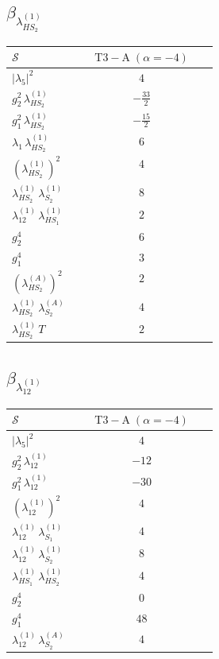 \documentclass[9pt]{article}
\begin{document}
\subsection*{$ \beta_{\lambda_{HS_2}^{(1)}} $}
\begin{longtable}{@{}p{0.31\linewidth}c@{}}
\toprule
$\mathcal{S}$ & $ \mathrm{T3-A}\;(\alpha=-4) $ \\
\midrule
$ |\lambda_5|^2 $ & $ 4 $ \\
$ g_2^2\,\lambda_{HS_2}^{(1)} $ & $ - \frac{33}{2} $ \\
$ g_1^2\,\lambda_{HS_2}^{(1)} $ & $ - \frac{15}{2} $ \\
$ \lambda_1\,\lambda_{HS_2}^{(1)} $ & $ 6 $ \\
$ \left(\lambda_{HS_2}^{(1)}\right)^2 $ & $ 4 $ \\
$ \lambda_{HS_2}^{(1)}\,\lambda_{S_2}^{(1)} $ & $ 8 $ \\
$ \lambda_{12}^{(1)}\,\lambda_{HS_1}^{(1)} $ & $ 2 $ \\
$ g_2^4 $ & $ 6 $ \\
$ g_1^4 $ & $ 3 $ \\
$ \left(\lambda_{HS_2}^{(A)}\right)^2 $ & $ 2 $ \\
$ \lambda_{HS_2}^{(1)}\,\lambda_{S_2}^{(A)} $ & $ 4 $ \\
$ \lambda_{HS_2}^{(1)}\,T $ & $ 2 $ \\
\bottomrule
\end{longtable}
\subsection*{$ \beta_{\lambda_{12}^{(1)}} $}
\begin{longtable}{@{}p{0.31\linewidth}c@{}}
\toprule
$\mathcal{S}$ & $ \mathrm{T3-A}\;(\alpha=-4) $ \\
\midrule
$ |\lambda_5|^2 $ & $ 4 $ \\
$ g_2^2\,\lambda_{12}^{(1)} $ & $ -12 $ \\
$ g_1^2\,\lambda_{12}^{(1)} $ & $ -30 $ \\
$ \left(\lambda_{12}^{(1)}\right)^2 $ & $ 4 $ \\
$ \lambda_{12}^{(1)}\,\lambda_{S_1}^{(1)} $ & $ 4 $ \\
$ \lambda_{12}^{(1)}\,\lambda_{S_2}^{(1)} $ & $ 8 $ \\
$ \lambda_{HS_1}^{(1)}\,\lambda_{HS_2}^{(1)} $ & $ 4 $ \\
$ g_2^4 $ & $ 0 $ \\
$ g_1^4 $ & $ 48 $ \\
$ \lambda_{12}^{(1)}\,\lambda_{S_2}^{(A)} $ & $ 4 $ \\
\bottomrule
\end{longtable}
\end{document}
